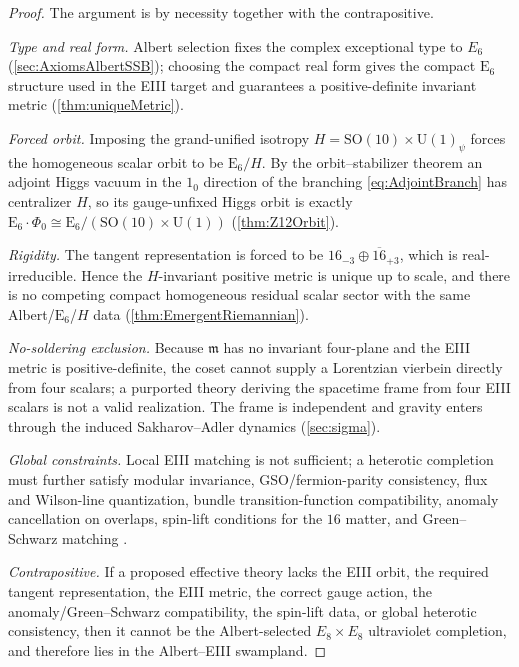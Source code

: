 \documentclass[pdflatex,sn-mathphys-num]{sn-jnl}
\theoremstyle{thmstyleone}
\theoremstyle{thmstyletwo}%
\theoremstyle{thmstylethree}%
\newcommand{\SO}[1]{\mathrm{SO(#1)}}
\newcommand{\U}[1]{\mathrm{U(#1)}}
\newcommand{\E}[1]{\mathrm{E_{#1}}}
\newcommand{\SOTen}{\SO{10}}
\newcommand{\UOne}{\U{1}}
\newcommand{\ESix}{\E{6}}
\newcommand{\SOTenXUOne}{\SOTen \times \UOne}
\newcommand{\MCosetInline}{\ESix/(\SOTenXUOne)}
\begin{document}
\begin{proof}
The argument is by necessity together with the contrapositive.

\emph{Type and real form.}  Albert selection fixes the complex exceptional type
to $E_{6}$ (\autoref{sec:AxiomsAlbertSSB}); choosing the compact real form gives the
compact $\ESix$ structure used in the EIII target and guarantees a
positive-definite invariant metric (\autoref{thm:uniqueMetric}).

\emph{Forced orbit.}  Imposing the grand-unified isotropy
$H=\SOTenXUOne_\psi$ forces the homogeneous scalar orbit to be $\ESix/H$.  By
the orbit--stabilizer theorem an adjoint Higgs vacuum in the $1_{0}$ direction of
the branching \eqref{eq:AdjointBranch} has centralizer $H$, so its gauge-unfixed
Higgs orbit is exactly $\ESix\cdot\Phi_{0}\cong\MCosetInline$
(\autoref{thm:Z12Orbit}).

\emph{Rigidity.}  The tangent representation is forced to be
$16_{-3}\oplus\overline{16}_{+3}$, which is real-irreducible.  Hence the
$H$-invariant positive metric is unique up to scale, and there is no competing
compact homogeneous residual scalar sector with the same Albert/$\ESix$/$H$
data (\autoref{thm:EmergentRiemannian}).

\emph{No-soldering exclusion.}  Because $\mathfrak m$ has no invariant
four-plane and the EIII metric is positive-definite, the coset cannot supply a
Lorentzian vierbein directly from four scalars; a purported theory deriving the
spacetime frame from four EIII scalars is not a valid realization.  The frame is
independent and gravity enters through the induced Sakharov--Adler dynamics
(\autoref{sec:sigma}).

\emph{Global constraints.}  Local EIII matching is not sufficient; a heterotic
completion must further satisfy modular invariance, GSO/fermion-parity
consistency, flux and Wilson-line quantization, bundle transition-function
compatibility, anomaly cancellation on overlaps, spin-lift conditions for the
$16$ matter, and Green--Schwarz matching \cite{GreenSchwarz:1984}.

\emph{Contrapositive.}  If a proposed effective theory lacks the EIII orbit, the
required tangent representation, the EIII metric, the correct gauge action, the
anomaly/Green--Schwarz compatibility, the spin-lift data, or global heterotic
consistency, then it cannot be the Albert-selected $E_{8}\times E_{8}$
ultraviolet completion, and therefore lies in the Albert--EIII swampland.
\end{proof}
\end{document}
